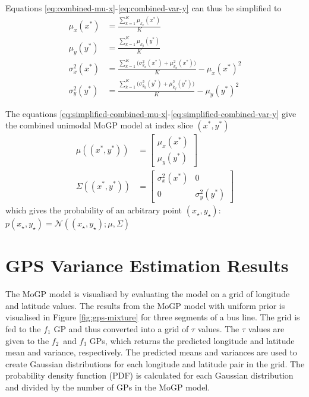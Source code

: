 Equations \ref{eq:combined-mu-x}-\ref{eq:combined-var-y} can thus be simplified to
\begin{align}
    \mu_x(x^*) &= \frac{\sum_{k=1}^{K} \mu_{k_x}(x^*)}{K} \label{eq:simplified-combined-mu-x} \\
    \mu_y(y^*) &= \frac{\sum_{k=1}^{K} \mu_{k_y}(y^*)}{K} \label{eq:simplified-combined-mu-y} \\
    \sigma_x^2(x^*) &= \frac{\sum_{k=1}^{K} \Big(\sigma_{k_x}^2(x^*) + \mu_{k_x}^2(x^*)\Big)}{K} - \mu_x(x^*)^2 \label{eq:simplified-combined-var-x} \\
    \sigma_y^2(y^*) &= \frac{\sum_{k=1}^{K} \Big(\sigma_{k_y}^2(y^*) + \mu_{k_y}^2(y^*)\Big)}{K} - \mu_y(y^*)^2 \label{eq:simplified-combined-var-y}
\end{align}

The equations \ref{eq:simplified-combined-mu-x}-\ref{eq:simplified-combined-var-y} give the combined unimodal MoGP model at index slice $(x^*, y^*)$
\begin{align}
\mu((x^*, y^*)) &= \begin{bmatrix} \mu_x(x^*) \\ \mu_y(y^*) \end{bmatrix} \\
\Sigma((x^*, y^*)) &= \begin{bmatrix} \sigma^2_x(x^*) & 0 \\ 0 & \sigma^2_y(y^*) \end{bmatrix}
\end{align}
which gives the probability of an arbitrary point $(x_\star, y_\star)$: $p(x_\star, y_\star) = \mathcal{N}((x_\star, y_\star); \mu, \Sigma)$

\section{GPS Variance Estimation Results} \label{sec:gps-var-result}

The MoGP model is visualised by evaluating the model on a grid of longitude and latitude values.
The results from the MoGP model with uniform prior is visualised in Figure \ref{fig:gps-mixture} for three segments of a bus line.
The grid is fed to the $f_1$ GP and thus converted into a grid of $\tau$ values.
The $\tau$ values are given to the $f_2$ and $f_3$ GPs, which returns the predicted longitude and latitude mean and variance, respectively. 
The predicted means and variances are used to create Gaussian distributions for each longitude and latitude pair in the grid.
The probability density function (PDF) is calculated for each Gaussian distribution and divided by the number of GPs in the MoGP model.


